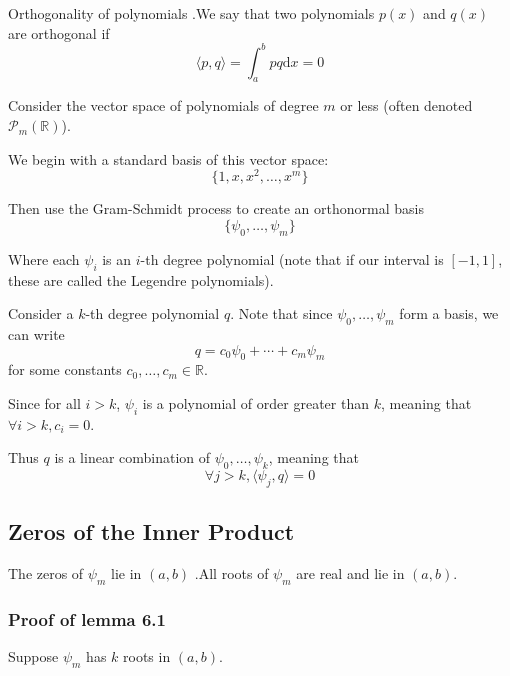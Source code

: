 \documentclass[12pt,letterpaper]{article}
\newcommand{\R}{\mathbb{R}}
\newcommand{\dd}{\mathrm{d}}
\begin{document}
\begin{defn}{Orthogonality of polynomials}
.We say that two polynomials $p(x)$ and $q(x)$ are orthogonal if
\begin{equation}
	\langle p, q \rangle = \int_a^b pq \dd x = 0
\end{equation}
\label{defn:orthogonal}
\end{defn}

Consider the vector space of polynomials of degree $m$ or less (often denoted $\mathcal{P}_m(\R)$).

We begin with a standard basis of this vector space:
\begin{equation}
	\{1, x, x^2, \dots, x^m\}
\end{equation}

Then use the Gram-Schmidt process to create an orthonormal basis
\begin{equation}
	\{\psi_0, \dots, \psi_m\}
\end{equation}

Where each $\psi_i$ is an $i$-th degree polynomial (note that if our interval is $[-1, 1]$, these are called the Legendre polynomials).

Consider a $k$-th degree polynomial $q$. Note that since $\psi_0, \dots, \psi_m$ form a basis, we can write
\begin{equation}
	q = c_0 \psi_0 + \cdots + c_m \psi_m
\end{equation}
for some constants $c_0, \dots, c_m \in \R$.

Since for all $i > k$, $\psi_i$ is a polynomial of order greater than $k$, meaning that $\forall i > k, c_i = 0$.

Thus $q$ is a linear combination of $\psi_0, \dots, \psi_k$, meaning that
\begin{equation}
	\forall j > k, \langle \psi_j, q \rangle = 0
\end{equation}

\subsection{Zeros of the Inner Product}
\begin{lemma}{The zeros of $\psi_m$ lie in $(a, b)$}
.All roots of $\psi_m$ are real and lie in $(a,b)$.

\label{thm:zero_of_inner}
\end{lemma}

\subsubsection*{Proof of lemma 6.1}
Suppose $\psi_m$ has $k$ roots in $(a, b)$.
\end{document}
